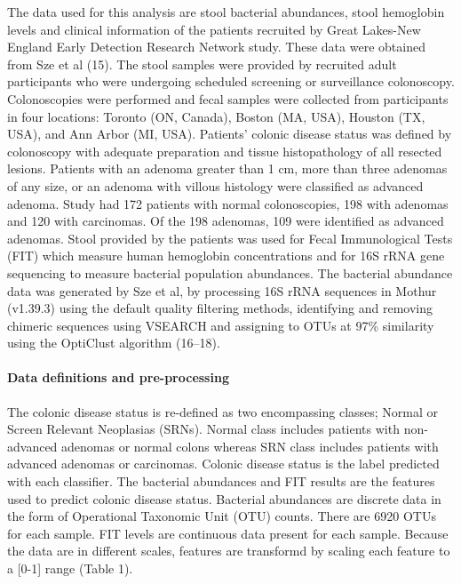 \documentclass[11pt,]{article}
\let\oldparagraph\paragraph
\renewcommand{\paragraph}[1]{\oldparagraph{#1}\mbox{}}
\begin{document}
The data used for this analysis are stool bacterial abundances, stool
hemoglobin levels and clinical information of the patients recruited by
Great Lakes-New England Early Detection Research Network study. These
data were obtained from Sze et al (15). The stool samples were provided
by recruited adult participants who were undergoing scheduled screening
or surveillance colonoscopy. Colonoscopies were performed and fecal
samples were collected from participants in four locations: Toronto (ON,
Canada), Boston (MA, USA), Houston (TX, USA), and Ann Arbor (MI, USA).
Patients' colonic disease status was defined by colonoscopy with
adequate preparation and tissue histopathology of all resected lesions.
Patients with an adenoma greater than 1 cm, more than three adenomas of
any size, or an adenoma with villous histology were classified as
advanced adenoma. Study had 172 patients with normal colonoscopies, 198
with adenomas and 120 with carcinomas. Of the 198 adenomas, 109 were
identified as advanced adenomas. Stool provided by the patients was used
for Fecal Immunological Tests (FIT) which measure human hemoglobin
concentrations and for 16S rRNA gene sequencing to measure bacterial
population abundances. The bacterial abundance data was generated by Sze
et al, by processing 16S rRNA sequences in Mothur (v1.39.3) using the
default quality filtering methods, identifying and removing chimeric
sequences using VSEARCH and assigning to OTUs at 97\% similarity using
the OptiClust algorithm (16--18).

\paragraph{Data definitions and
pre-processing}\label{data-definitions-and-pre-processing}

The colonic disease status is re-defined as two encompassing classes;
Normal or Screen Relevant Neoplasias (SRNs). Normal class includes
patients with non-advanced adenomas or normal colons whereas SRN class
includes patients with advanced adenomas or carcinomas. Colonic disease
status is the label predicted with each classifier. The bacterial
abundances and FIT results are the features used to predict colonic
disease status. Bacterial abundances are discrete data in the form of
Operational Taxonomic Unit (OTU) counts. There are 6920 OTUs for each
sample. FIT levels are continuous data present for each sample. Because
the data are in different scales, features are transformd by scaling
each feature to a {[}0-1{]} range (Table 1).
\end{document}

